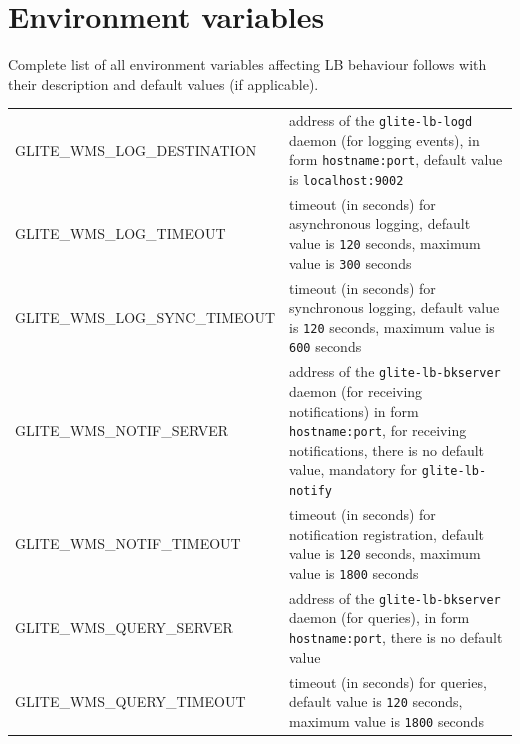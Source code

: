 \newpage
\section{Environment variables}
\label{a:environment}

Complete list of all environment variables affecting LB behaviour follows with 
their description and default values (if applicable).


\begin{tabularx}{\textwidth}{l>{\raggedright\arraybackslash}X}
GLITE\_WMS\_LOG\_DESTINATION & 
   address of the \texttt{glite-lb-logd} daemon (for logging events), 
   in form \texttt{hostname:port},
   default value is \texttt{localhost:9002}\\
GLITE\_WMS\_LOG\_TIMEOUT & 
   timeout (in seconds) for asynchronous logging, 
   default value is \texttt{120} seconds, 
   maximum value is \texttt{300} seconds \\
GLITE\_WMS\_LOG\_SYNC\_TIMEOUT & 
   timeout (in seconds) for synchronous logging, 
   default value is \texttt{120} seconds, 
   maximum value is \texttt{600} seconds \\
GLITE\_WMS\_NOTIF\_SERVER & 
   address of the \texttt{glite-lb-bkserver} daemon (for receiving notifications)
   in form \texttt{hostname:port}, for receiving notifications,
   there is no default value,
   mandatory for \texttt{glite-lb-notify} \\
GLITE\_WMS\_NOTIF\_TIMEOUT & 
   timeout (in seconds) for notification registration,
   default value is \texttt{120} seconds,
   maximum value is \texttt{1800} seconds \\
GLITE\_WMS\_QUERY\_SERVER & 
   address of the \texttt{glite-lb-bkserver} daemon (for queries), 
   in form \texttt{hostname:port}, 
   there is no default value \\
GLITE\_WMS\_QUERY\_TIMEOUT &
   timeout (in seconds) for queries,
   default value is \texttt{120} seconds,
   maximum value is \texttt{1800} seconds \\

\end{tabularx}
